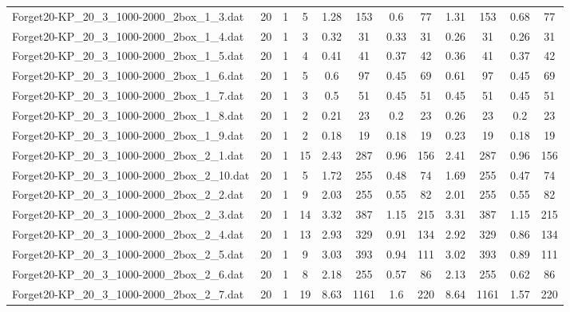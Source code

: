 \begin{sidewaystable}[!ht]
{\begin{tabular}{lccccccccccc}
Forget20-KP\_20\_3\_1000-2000\_2box\_1\_3.dat & 20 & 1 & 5 & 1.28 & 153 &  \textcolor{blue2}{0.6} & 77 & 1.31 & 153 & 0.68 & 77 \\
Forget20-KP\_20\_3\_1000-2000\_2box\_1\_4.dat & 20 & 1 & 3 & 0.32 & 31 & 0.33 & 31 &  \textcolor{blue2}{0.26} & 31 &  \textcolor{blue2}{0.26} & 31 \\
Forget20-KP\_20\_3\_1000-2000\_2box\_1\_5.dat & 20 & 1 & 4 & 0.41 & 41 & 0.37 & 42 &  \textcolor{blue2}{0.36} & 41 & 0.37 & 42 \\
Forget20-KP\_20\_3\_1000-2000\_2box\_1\_6.dat & 20 & 1 & 5 & 0.6 & 97 &  \textcolor{blue2}{0.45} & 69 & 0.61 & 97 &  \textcolor{blue2}{0.45} & 69 \\
Forget20-KP\_20\_3\_1000-2000\_2box\_1\_7.dat & 20 & 1 & 3 & 0.5 & 51 & 0.45 & 51 & 0.45 & 51 & 0.45 & 51 \\
Forget20-KP\_20\_3\_1000-2000\_2box\_1\_8.dat & 20 & 1 & 2 & 0.21 & 23 &  \textcolor{blue2}{0.2} & 23 & 0.26 & 23 &  \textcolor{blue2}{0.2} & 23 \\
Forget20-KP\_20\_3\_1000-2000\_2box\_1\_9.dat & 20 & 1 & 2 &  \textcolor{blue2}{0.18} & 19 &  \textcolor{blue2}{0.18} & 19 & 0.23 & 19 &  \textcolor{blue2}{0.18} & 19 \\
Forget20-KP\_20\_3\_1000-2000\_2box\_2\_1.dat & 20 & 1 & 15 & 2.43 & 287 & 0.96 & 156 & 2.41 & 287 & 0.96 & 156 \\
Forget20-KP\_20\_3\_1000-2000\_2box\_2\_10.dat & 20 & 1 & 5 & 1.72 & 255 & 0.48 & 74 & 1.69 & 255 &  \textcolor{blue2}{0.47} & 74 \\
Forget20-KP\_20\_3\_1000-2000\_2box\_2\_2.dat & 20 & 1 & 9 & 2.03 & 255 &  \textcolor{blue2}{0.55} & 82 & 2.01 & 255 &  \textcolor{blue2}{0.55} & 82 \\
Forget20-KP\_20\_3\_1000-2000\_2box\_2\_3.dat & 20 & 1 & 14 & 3.32 & 387 &  \textcolor{blue2}{1.15} & 215 & 3.31 & 387 &  \textcolor{blue2}{1.15} & 215 \\
Forget20-KP\_20\_3\_1000-2000\_2box\_2\_4.dat & 20 & 1 & 13 & 2.93 & 329 & 0.91 & 134 & 2.92 & 329 & 0.86 & 134 \\
Forget20-KP\_20\_3\_1000-2000\_2box\_2\_5.dat & 20 & 1 & 9 & 3.03 & 393 & 0.94 & 111 & 3.02 & 393 & 0.89 & 111 \\
Forget20-KP\_20\_3\_1000-2000\_2box\_2\_6.dat & 20 & 1 & 8 & 2.18 & 255 &  \textcolor{blue2}{0.57} & 86 & 2.13 & 255 & 0.62 & 86 \\
Forget20-KP\_20\_3\_1000-2000\_2box\_2\_7.dat & 20 & 1 & 19 & 8.63 & 1161 & 1.6 & 220 & 8.64 & 1161 & 1.57 & 220 \\

\end{tabular}}
\end{sidewaystable}
